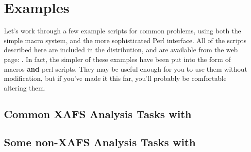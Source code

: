 \section{Examples}  \label{Ch:Examples}

Let's work through a few example scripts for common problems, using both
the simple {\ifeffit} macro system, and the more sophisticated Perl
interface.  All of the scripts described here are included in the
{\ifeffit} distribution, and are available from the {\ifeffit} web page:
{\WWWiff}.  In fact, the simpler of these examples have been put into
the form of {\ifeffit} macros {\bf{and}} perl scripts.   They may be useful
enough for you to use them without modification, but if you've made it this
far, you'll probably be comfortable altering them.

\subsection{Common XAFS Analysis Tasks with {\ifeffit}}\label{Ch:Examples-common}


\subsection{Some non-XAFS Analysis Tasks with {\ifeffit}}\label{Ch:Examples-misc}


